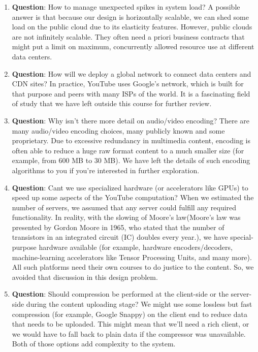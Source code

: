 \begin{enumerate}
\item
\protect{}\label{gfuokImSTEGj-aY1FB2lZ}
\textbf{Question}: How to manage unexpected spikes in system load? A possible answer is that because our design is horizontally scalable, we can shed some load on the public cloud due to its elasticity features. However, public clouds are not infinitely scalable. They often need a priori business contracts that might put a limit on maximum, concurrently allowed resource use at different data centers.
\item
\protect{}\label{UPnIbAxyXNSp-ci3NQ6qD}
\textbf{Question}: How will we deploy a global network to connect data centers and CDN sites? In practice, YouTube uses Google's network, which is built for that purpose and peers with many ISPs of the world. It is a fascinating field of study that we have left outside this course for further review.
\item
\protect{}\label{4Ei_aQxqZvxrfuo_8Q7O1}
\textbf{Question}: Why isn't there more detail on audio/video encoding? There are many audio/video encoding choices, many publicly known and some proprietary. Due to excessive redundancy in multimedia content, encoding is often able to reduce a huge raw format content to a much smaller size (for example, from 600 MB to 30 MB). We have left the details of such encoding algorithms to you if you're interested in further exploration.
\item
\protect{}\label{1-5h0wLeJCIw2HzO8nULP}
\textbf{Question}: Cant we use specialized hardware (or accelerators like GPUs) to speed up some aspects of the YouTube computation? When we estimated the number of servers, we assumed that any server could fulfill any required functionality. In reality, with the slowing of Moore's law(Moore's law was presented by Gordon Moore in 1965, who stated that the number of transistors in an integrated circuit (IC) doubles every year.), we have special-purpose hardware available (for example, hardware encoders/decoders, machine-learning accelerators like Tensor Processing Units, and many more). All such platforms need their own courses to do justice to the content. So, we avoided that discussion in this design problem.
\item
\protect{}\label{JzWRqaJErxE56N_vPoTc6}
\textbf{Question}: Should compression be performed at the client-side or the server-side during the content uploading stage? We might use some lossless but fast compression (for example, Google Snappy) on the client end to reduce data that needs to be uploaded. This might mean that we'll need a rich client, or we would have to fall back to plain data if the compressor was unavailable. Both of those options add complexity to the system.

\end{enumerate}
